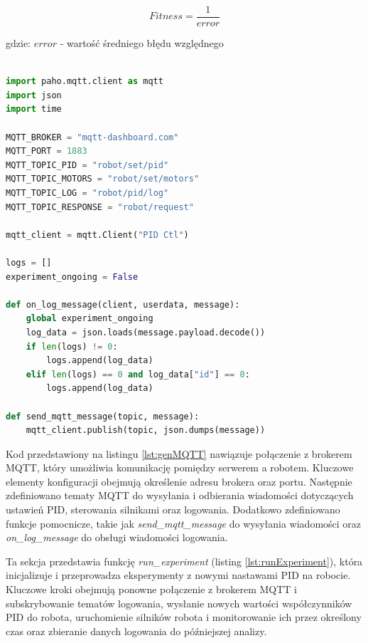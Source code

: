 \documentclass[12pt,twoside]{article}
\begin{document}
\begin{equation}
Fitness = \frac{1}{error}
\label{Eq:fitness}
\end{equation}

gdzie: $error$ - wartość średniego błędu względnego \\ \\

\newpage

\begin{lstlisting}[language=Python, caption=Konfiguracja MQTT, label={lst:genMQTT}]
import paho.mqtt.client as mqtt
import json
import time

MQTT_BROKER = "mqtt-dashboard.com"
MQTT_PORT = 1883
MQTT_TOPIC_PID = "robot/set/pid"
MQTT_TOPIC_MOTORS = "robot/set/motors"
MQTT_TOPIC_LOG = "robot/pid/log"
MQTT_TOPIC_RESPONSE = "robot/request"

mqtt_client = mqtt.Client("PID Ctl")

logs = []
experiment_ongoing = False

def on_log_message(client, userdata, message):
    global experiment_ongoing
    log_data = json.loads(message.payload.decode())
    if len(logs) != 0: 
        logs.append(log_data) 
    elif len(logs) == 0 and log_data["id"] == 0:
        logs.append(log_data)

def send_mqtt_message(topic, message):
    mqtt_client.publish(topic, json.dumps(message))
\end{lstlisting}

Kod przedstawiony na listingu \ref{lst:genMQTT} nawiązuje połączenie z brokerem MQTT, który umożliwia komunikację pomiędzy serwerem a robotem. Kluczowe elementy konfiguracji obejmują określenie adresu brokera oraz portu. Następnie zdefiniowano tematy MQTT do wysyłania i odbierania wiadomości dotyczących ustawień PID, sterowania silnikami oraz logowania. Dodatkowo zdefiniowano funkcje pomocnicze, takie jak \textit{send\_mqtt\_message} do wysyłania wiadomości oraz \textit{on\_log\_message} do obsługi wiadomości logowania.

Ta sekcja przedstawia funkcję \textit{run\_experiment} (listing \ref{lst:runExperiment}), która inicjalizuje i przeprowadza eksperymenty z nowymi nastawami PID na robocie. Kluczowe kroki obejmują ponowne połączenie z brokerem MQTT i subskrybowanie tematów logowania, wysłanie nowych wartości współczynników PID do robota, uruchomienie silników robota i monitorowanie ich przez określony czas oraz zbieranie danych logowania do późniejszej analizy.
\end{document}
